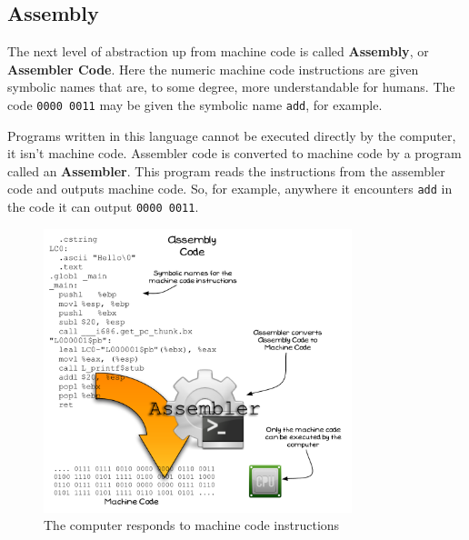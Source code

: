 \clearpage
\subsection{Assembly} %
\label{sub:assembly}

The next level of abstraction up from machine code is called \textbf{Assembly}, or \textbf{Assembler Code}. Here the numeric machine code instructions are given symbolic names that are, to some degree, more understandable for humans. The code \texttt{0000 0011} may be given the symbolic name \texttt{add}, for example.

Programs written in this language cannot be executed directly by the computer, it isn't machine code. Assembler code is converted to machine code by a program called an \textbf{Assembler}. This program reads the instructions from the assembler code and outputs machine code. So, for example, anywhere it encounters \texttt{add} in the code it can output \texttt{0000 0011}.

\begin{figure}[h]
   \centering
   \includegraphics[width=0.8\textwidth]{./topics/programs-and-compilers/diagrams/Assembly} 
   \caption{The computer responds to machine code instructions}
   \label{fig:assembly}
\end{figure}


